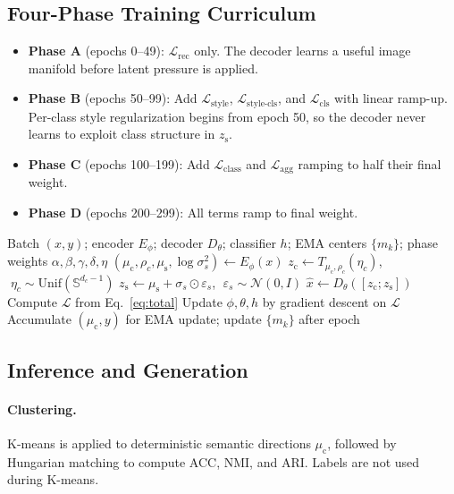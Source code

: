 \documentclass[10pt]{article}
\newcommand{\ours}{F-CS-WAE}
\newcommand{\zc}{z_{\mathrm{c}}}
\newcommand{\zs}{z_{\mathrm{s}}}
\newcommand{\muc}{\mu_{\mathrm{c}}}
\newcommand{\mus}{\mu_{\mathrm{s}}}
\newcommand{\Sph}{\mathbb{S}}
\begin{document}
\subsection{Four-Phase Training Curriculum}

\begin{itemize}
  \item \textbf{Phase A} (epochs 0--49):
        $\mathcal{L}_{\mathrm{rec}}$ only.
        The decoder learns a useful image manifold before latent pressure is applied.
  \item \textbf{Phase B} (epochs 50--99):
        Add $\mathcal{L}_{\mathrm{style}}$, $\mathcal{L}_{\mathrm{style\text{-}cls}}$,
        and $\mathcal{L}_{\mathrm{cls}}$ with linear ramp-up.
        Per-class style regularization begins from epoch 50, so the decoder never
        learns to exploit class structure in $\zs$.
  \item \textbf{Phase C} (epochs 100--199):
        Add $\mathcal{L}_{\mathrm{class}}$ and $\mathcal{L}_{\mathrm{agg}}$ ramping
        to half their final weight.
  \item \textbf{Phase D} (epochs 200--299):
        All terms ramp to final weight.
\end{itemize}

\begin{algorithm}[t]
\caption{\ours{} training iteration}
\label{alg:fcswae}
\begin{algorithmic}[1]
\Require Batch $(x,y)$; encoder $E_\phi$; decoder $D_\theta$; classifier $h$;
         EMA centers $\{m_k\}$; phase weights $\alpha,\beta,\gamma,\delta,\eta$
\State $(\muc,\rho_c,\mus,\log\sigma_s^2)\leftarrow E_\phi(x)$
\State $\zc\leftarrow T_{\muc,\rho_c}(\eta_c)$, $\;\eta_c\sim\mathrm{Unif}(\Sph^{d_c-1})$
\State $\zs\leftarrow \mus+\sigma_s\odot\varepsilon_s$, $\;\varepsilon_s\sim\mathcal{N}(0,I)$
\State $\hat{x}\leftarrow D_\theta([\zc;\zs])$
\State Compute $\mathcal{L}$ from Eq.~\ref{eq:total}
\State Update $\phi,\theta,h$ by gradient descent on $\mathcal{L}$
\State Accumulate $(\muc,y)$ for EMA update; update $\{m_k\}$ after epoch
\end{algorithmic}
\end{algorithm}

\subsection{Inference and Generation}

\paragraph{Clustering.}
K-means is applied to deterministic semantic directions $\muc$, followed by
Hungarian matching to compute ACC, NMI, and ARI.
Labels are not used during K-means.
\end{document}
